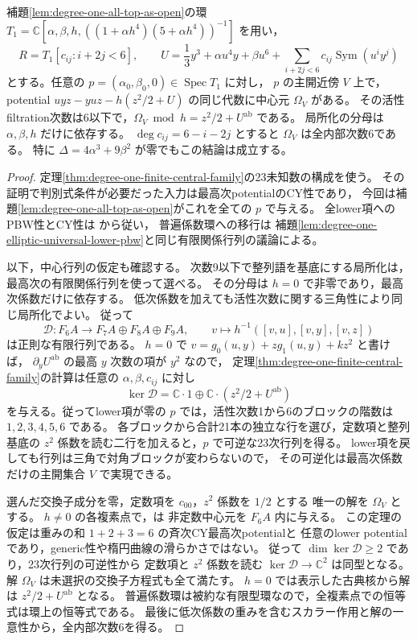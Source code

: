 \begin{lemma}[判別式条件を除いた有限局所中心]
\label{lem:degree-one-all-top-finite-center}
補題\ref{lem:degree-one-all-top-as-open}の環
$T_1=\mathbb C[\alpha,\beta,h,((1+\alpha h^4)(5+\alpha h^4))^{-1}]$
を用い，
\[
 R=T_1[c_{ij}:i+2j<6],\qquad
 U=\frac13y^3+\alpha u^4y+\beta u^6
       +\sum_{i+2j<6}c_{ij}\operatorname{Sym}(u^iy^j)
\]
とする。任意の $p=(\alpha_0,\beta_0,0)\in\operatorname{Spec}T_1$ に対し，
$p$ の主開近傍 $V$ 上で，potential
$uyz-yuz-h(z^2/2+U)$ の同じ代数に中心元 $\Omega_V$ がある。
その活性filtration次数は6以下で，$\Omega_V\bmod h=z^2/2+U^{\mathrm{ab}}$ である。
局所化の分母は $\alpha,\beta,h$ だけに依存する。
$\deg c_{ij}=6-i-2j$ とすると $\Omega_V$ は全内部次数6である。
特に $\Delta=4\alpha^3+9\beta^2$ が零でもこの結論は成立する。
\end{lemma}
\begin{proof}
定理\ref{thm:degree-one-finite-central-family}の23未知数の構成を使う。
その証明で判別式条件が必要だった入力は最高次potentialのCY性であり，
今回は補題\ref{lem:degree-one-all-top-as-open}がこれを全ての $p$ で与える。
全lower項へのPBW性とCY性は
\cite[Proposition~7.3.1(ii)]{EG2010}から従い，
普遍係数環への移行は
補題\ref{lem:degree-one-elliptic-universal-lower-pbw}と同じ有限関係行列の議論による。

以下，中心行列の仮定も確認する。
次数9以下で整列語を基底にする局所化は，最高次の有限関係行列を使って選べる。
その分母は $h=0$ で非零であり，最高次係数だけに依存する。
低次係数を加えても活性次数に関する三角性により同じ局所化でよい。
従って
\[
 \mathcal D:F_6A\longrightarrow F_7A\oplus F_8A\oplus F_9A,
 \qquad v\longmapsto h^{-1}([v,u],[v,y],[v,z])
\]
は正則な有限行列である。
$h=0$ で $v=g_0(u,y)+zg_1(u,y)+kz^2$ と書けば，
$\partial_yU^{\mathrm{ab}}$ の最高 $y$ 次数の項が $y^2$ なので，
定理\ref{thm:degree-one-finite-central-family}の計算は任意の
$\alpha,\beta,c_{ij}$ に対し
\[
 \ker\mathcal D=\mathbb C\cdot1
              \oplus\mathbb C\cdot(z^2/2+U^{\mathrm{ab}})
\]
を与える。従ってlower項が零の $p$ では，活性次数1から6のブロックの階数は
$1,2,3,4,5,6$ である。
各ブロックから合計21本の独立な行を選び，定数項と整列基底の
$z^2$ 係数を読む二行を加えると，$p$ で可逆な23次行列を得る。
lower項を戻しても行列は三角で対角ブロックが変わらないので，
その可逆化は最高次係数だけの主開集合 $V$ で実現できる。

選んだ交換子成分を零，定数項を $c_{00}$，$z^2$ 係数を $1/2$ とする
唯一の解を $\Omega_V$ とする。
$h\ne0$ の各複素点で，\cite[Theorem~3.3.2(ii)]{EG2010}は
非定数中心元を $F_6A$ 内に与える。
この定理の仮定は重みの和 $1+2+3=6$ の斉次CY最高次potentialと
任意のlower potentialであり，generic性や楕円曲線の滑らかさではない。
従って $\dim\ker\mathcal D\ge2$ であり，23次行列の可逆性から
定数項と $z^2$ 係数を読む $\ker\mathcal D\to\mathbb C^2$ は同型となる。
解 $\Omega_V$ は未選択の交換子方程式も全て満たす。
$h=0$ では表示した古典核から解は $z^2/2+U^{\mathrm{ab}}$ となる。
普遍係数環は被約な有限型環なので，全複素点での恒等式は環上の恒等式である。
最後に低次係数の重みを含むスカラー作用と解の一意性から，全内部次数6を得る。
\end{proof}


